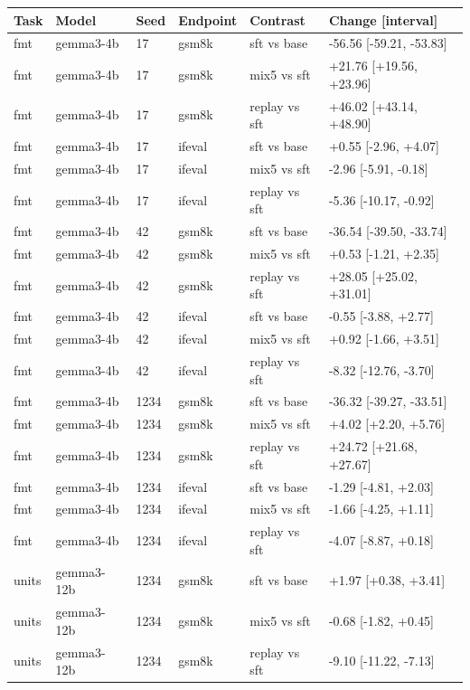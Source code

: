 \begin{table}[t]
\centering\small
\begin{tabular}{llllll}
\toprule
Task & Model & Seed & Endpoint & Contrast & Change [interval] \\
\midrule
fmt & gemma3-4b & 17 & gsm8k & sft vs base & -56.56 [-59.21, -53.83] \\
fmt & gemma3-4b & 17 & gsm8k & mix5 vs sft & +21.76 [+19.56, +23.96] \\
fmt & gemma3-4b & 17 & gsm8k & replay vs sft & +46.02 [+43.14, +48.90] \\
fmt & gemma3-4b & 17 & ifeval & sft vs base & +0.55 [-2.96, +4.07] \\
fmt & gemma3-4b & 17 & ifeval & mix5 vs sft & -2.96 [-5.91, -0.18] \\
fmt & gemma3-4b & 17 & ifeval & replay vs sft & -5.36 [-10.17, -0.92] \\
fmt & gemma3-4b & 42 & gsm8k & sft vs base & -36.54 [-39.50, -33.74] \\
fmt & gemma3-4b & 42 & gsm8k & mix5 vs sft & +0.53 [-1.21, +2.35] \\
fmt & gemma3-4b & 42 & gsm8k & replay vs sft & +28.05 [+25.02, +31.01] \\
fmt & gemma3-4b & 42 & ifeval & sft vs base & -0.55 [-3.88, +2.77] \\
fmt & gemma3-4b & 42 & ifeval & mix5 vs sft & +0.92 [-1.66, +3.51] \\
fmt & gemma3-4b & 42 & ifeval & replay vs sft & -8.32 [-12.76, -3.70] \\
fmt & gemma3-4b & 1234 & gsm8k & sft vs base & -36.32 [-39.27, -33.51] \\
fmt & gemma3-4b & 1234 & gsm8k & mix5 vs sft & +4.02 [+2.20, +5.76] \\
fmt & gemma3-4b & 1234 & gsm8k & replay vs sft & +24.72 [+21.68, +27.67] \\
fmt & gemma3-4b & 1234 & ifeval & sft vs base & -1.29 [-4.81, +2.03] \\
fmt & gemma3-4b & 1234 & ifeval & mix5 vs sft & -1.66 [-4.25, +1.11] \\
fmt & gemma3-4b & 1234 & ifeval & replay vs sft & -4.07 [-8.87, +0.18] \\
units & gemma3-12b & 1234 & gsm8k & sft vs base & +1.97 [+0.38, +3.41] \\
units & gemma3-12b & 1234 & gsm8k & mix5 vs sft & -0.68 [-1.82, +0.45] \\
units & gemma3-12b & 1234 & gsm8k & replay vs sft & -9.10 [-11.22, -7.13] \\

\end{tabular}
\end{table}
